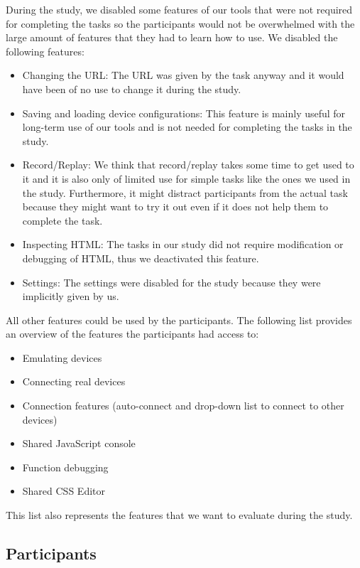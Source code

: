 During the study, we disabled some features of our tools that were not required for completing the tasks so the participants would not be overwhelmed with the large amount of features that they had to learn how to use. We disabled the following features:
\begin{itemize}
	\item Changing the URL: The URL was given by the task anyway and it would have been of no use to change it during the study.
	\item Saving and loading device configurations: This feature is mainly useful for long-term use of our tools and is not needed for completing the tasks in the study.
	\item Record/Replay: We think that record/replay takes some time to get used to it and it is also only of limited use for simple tasks like the ones we used in the study. Furthermore, it might distract participants from the actual task because they might want to try it out even if it does not help them to complete the task.
	\item Inspecting HTML: The tasks in our study did not require modification or debugging of HTML, thus we deactivated this feature.
	\item Settings: The settings were disabled for the study because they were implicitly given by us.
\end{itemize}

All other features could be used by the participants. The following list provides an overview of the features the participants had access to:
\begin{itemize}
	\item Emulating devices
	\item Connecting real devices
	\item Connection features (auto-connect and drop-down list to connect to other devices)
	\item Shared JavaScript console
	\item Function debugging
	\item Shared CSS Editor
\end{itemize}
This list also represents the features that we want to evaluate during the study.

\subsection{Participants}

